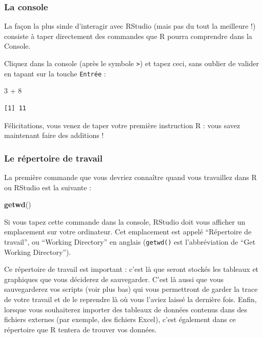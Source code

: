 \documentclass[a4paperpaper,]{article}
\newenvironment{Shaded}{\begin{snugshade}}{\end{snugshade}}
\newcommand{\DecValTok}[1]{\textcolor[rgb]{0.69,0.50,0.00}{#1}}
\newcommand{\KeywordTok}[1]{\textcolor[rgb]{0.12,0.11,0.11}{\textbf{#1}}}
\newcommand{\NormalTok}[1]{\textcolor[rgb]{0.12,0.11,0.11}{#1}}
\newcommand{\OperatorTok}[1]{\textcolor[rgb]{0.12,0.11,0.11}{#1}}
\newcommand{\StringTok}[1]{\textcolor[rgb]{0.75,0.01,0.01}{#1}}
\begin{document}
\hypertarget{la-console}{%
\subsubsection{La console}\label{la-console}}

La façon la plus simle d'interagir avec RStudio (mais pas du tout la meilleure !) consiste à taper directement des commandes que R pourra comprendre dans la Console.

Cliquez dans la console (après le symbole \texttt{\textgreater{}}) et tapez ceci, sans oublier de valider en tapant sur la touche \texttt{Entrée} :

\begin{Shaded}
\begin{Highlighting}[]
\DecValTok{3} \OperatorTok{+}\StringTok{ }\DecValTok{8}
\end{Highlighting}
\end{Shaded}

\begin{verbatim}
[1] 11
\end{verbatim}

Félicitations, vous venez de taper votre première instruction R : vous savez maintenant faire des additions !

\hypertarget{le-repertoire-de-travail}{%
\subsubsection{Le répertoire de travail}\label{le-repertoire-de-travail}}

La première commande que vous devriez connaître quand vous travaillez dans R ou RStudio est la suivante :

\begin{Shaded}
\begin{Highlighting}[]
\KeywordTok{getwd}\NormalTok{()}
\end{Highlighting}
\end{Shaded}

Si vous tapez cette commande dans la console, RStudio doit vous afficher un emplacement sur votre ordinateur. Cet emplacement est appelé ``Répertoire de travail'', ou ``Working Directory'' en anglais (\texttt{getwd()} est l'abbréviation de ``Get Working Directory'').

Ce répertoire de travail est important : c'est là que seront stockés les tableaux et graphiques que vous déciderez de sauvegarder. C'est là aussi que vous sauvegarderez vos scripts (voir plus bas) qui vous permettront de garder la trace de votre travail et de le reprendre là où vous l'aviez laissé la dernière fois. Enfin, lorsque vous souhaiterez importer des tableaux de données contenus dans des fichiers externes (par exemple, des fichiers Excel), c'est également dans ce répertoire que R tentera de trouver vos données.
\end{document}
